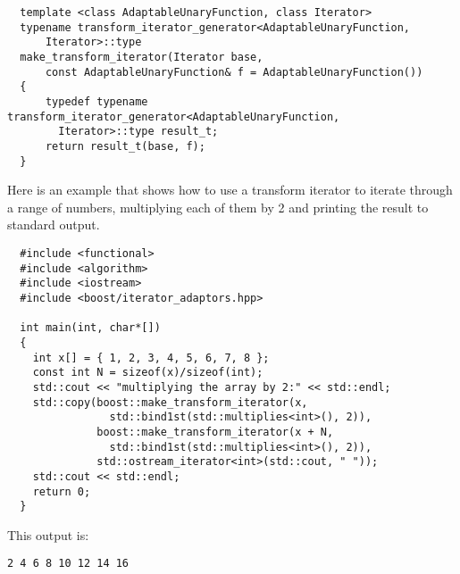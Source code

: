 \documentclass{netobjectdays}
\begin{document}
{\footnotesize
\begin{verbatim}
  template <class AdaptableUnaryFunction, class Iterator>
  typename transform_iterator_generator<AdaptableUnaryFunction,
      Iterator>::type
  make_transform_iterator(Iterator base,
      const AdaptableUnaryFunction& f = AdaptableUnaryFunction())
  {
      typedef typename transform_iterator_generator<AdaptableUnaryFunction,
        Iterator>::type result_t;
      return result_t(base, f);
  }
\end{verbatim}
}

Here is an example that shows how to use a transform iterator to
iterate through a range of numbers, multiplying each of them by 2
and printing the result to standard output.

{\footnotesize
\begin{verbatim}
  #include <functional>
  #include <algorithm>
  #include <iostream>
  #include <boost/iterator_adaptors.hpp>

  int main(int, char*[])
  {
    int x[] = { 1, 2, 3, 4, 5, 6, 7, 8 };
    const int N = sizeof(x)/sizeof(int);
    std::cout << "multiplying the array by 2:" << std::endl;
    std::copy(boost::make_transform_iterator(x, 
                std::bind1st(std::multiplies<int>(), 2)),
              boost::make_transform_iterator(x + N, 
                std::bind1st(std::multiplies<int>(), 2)),
              std::ostream_iterator<int>(std::cout, " "));
    std::cout << std::endl;
    return 0;
  }
\end{verbatim}
}

\noindent This output is: 
{\footnotesize
\begin{verbatim}
2 4 6 8 10 12 14 16
\end{verbatim}
}



\end{document}
